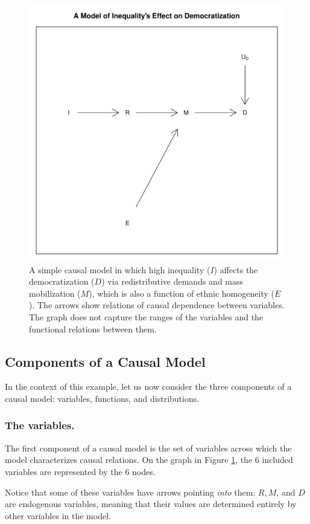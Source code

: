 \documentclass[12pt,]{book}
\begin{document}
\begin{figure}

{\centering \includegraphics[width=.5\textwidth]{ii_files/figure-latex/simpleDAG-1} 

}

\caption{A simple causal model in which high inequality ($I$) affects the democratization ($D$) via redistributive demands and mass mobilization ($M$), which is also a function of ethnic homogeneity ($E$). The arrows show relations of causal dependence between variables.  The graph does not capture the ranges of the variables and the functional relations between them.}\label{fig:simpleDAG}
\end{figure}

\hypertarget{components-of-a-causal-model}{%
\subsection{Components of a Causal Model}\label{components-of-a-causal-model}}

In the context of this example, let us now consider the three components of a causal model: variables, functions, and distributions.

\hypertarget{the-variables.}{%
\subsubsection{The variables.}\label{the-variables.}}

The first component of a causal model is the set of variables across which the model characterizes causal relations. On the graph in Figure \ref{fig:simpleDAG}, the 6 included variables are represented by the 6 nodes.

Notice that some of these variables have arrows pointing \emph{into} them: \(R, M\), and \(D\) are endogenous variables, meaning that their values are determined entirely by other variables in the model.
\end{document}
